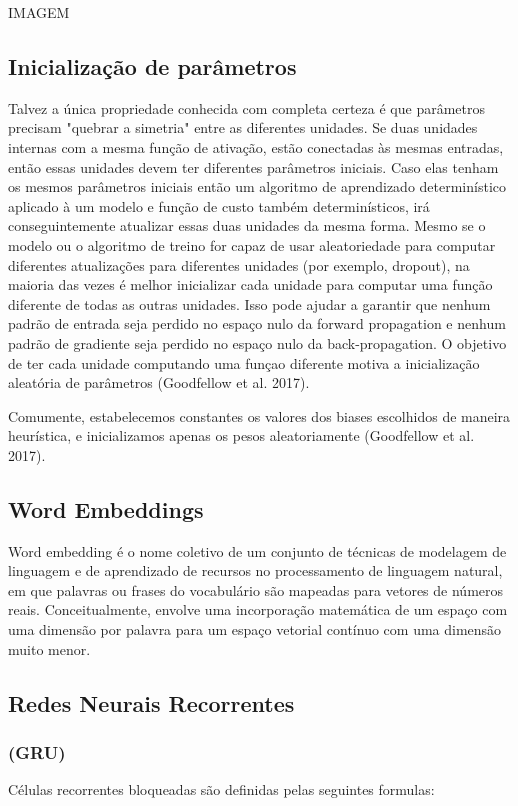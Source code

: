 \documentclass[12pt]{article}
\begin{document}
IMAGEM

\subsection{Inicialização de parâmetros}

Talvez a única propriedade conhecida com completa certeza é que parâmetros precisam "quebrar a simetria" entre as diferentes unidades. Se duas unidades internas com a mesma função de ativação, estão conectadas às mesmas entradas, então essas unidades devem ter diferentes parâmetros iniciais. Caso elas tenham os mesmos parâmetros iniciais então um algoritmo de aprendizado determinístico aplicado à um modelo e função de custo também determinísticos, irá conseguintemente atualizar essas duas unidades da mesma forma. Mesmo se o modelo ou o algoritmo de treino for capaz de usar aleatoriedade para computar diferentes atualizações para diferentes unidades (por exemplo, dropout), na maioria das vezes é melhor inicializar cada unidade para computar uma função diferente de todas as outras unidades. Isso pode ajudar a garantir que nenhum padrão de entrada seja perdido no espaço nulo da forward propagation e nenhum padrão de gradiente seja perdido no espaço nulo da back-propagation. O objetivo de ter cada unidade computando uma funçao diferente motiva a inicialização aleatória de parâmetros (Goodfellow et al. 2017).

Comumente, estabelecemos constantes os valores dos biases escolhidos de maneira heurística, e inicializamos apenas os pesos aleatoriamente (Goodfellow et al. 2017).

\subsection{Word Embeddings}

Word embedding é o nome coletivo de um conjunto de técnicas de modelagem de linguagem e de aprendizado de recursos no processamento de linguagem natural, em que palavras ou frases do vocabulário são mapeadas para vetores de números reais. Conceitualmente, envolve uma incorporação matemática de um espaço com uma dimensão por palavra para um espaço vetorial contínuo com uma dimensão muito menor.

\subsection{Redes Neurais Recorrentes}

\subsubsection{(GRU)}
Células recorrentes bloqueadas são definidas pelas seguintes formulas:
\end{document}
